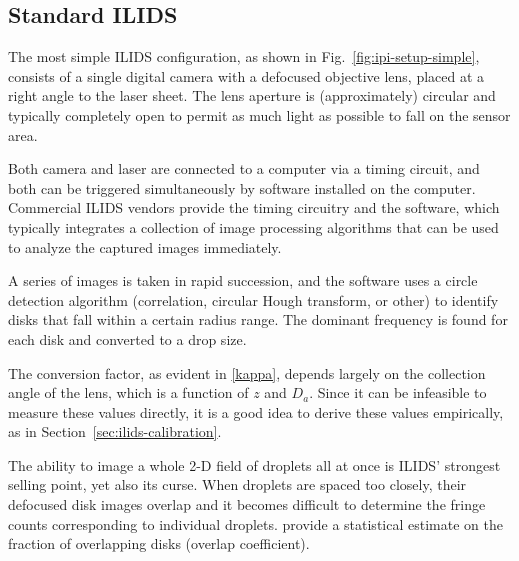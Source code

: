 \documentclass[11.5pt,oneside]{book}
\newcommand*{\figref}[1]{Fig.~\ref{#1}}
\newcommand*{\secref}[1]{Section~\ref{#1}}
\begin{document}
\subsection{Standard ILIDS}
The most simple ILIDS configuration, as shown in \figref{fig:ipi-setup-simple},
consists of a single digital camera with a defocused objective lens, placed at a right
angle to the laser sheet. The lens aperture is (approximately) circular and
typically completely open to permit as much light as possible to fall on the
sensor area.

Both camera and laser are connected to a computer via a timing circuit, and both
can be triggered simultaneously by software installed on the computer.
Commercial ILIDS vendors provide the timing circuitry and the software, which
typically integrates a collection of image processing algorithms that can be
used to analyze the captured images immediately.

A series of images is taken in rapid succession, and the software uses a circle
detection algorithm (correlation, circular Hough transform, or other) to
identify disks that fall within a certain radius range. The dominant frequency
is found for each disk and converted to a drop size.

The conversion factor, as evident in \eqref{kappa}, depends largely on the
collection angle of the lens, which is a function of $z$ and $D_a$. Since it can
be infeasible to measure these values directly, it is a good idea to derive
these values empirically, as in \secref{sec:ilids-calibration}.

The ability to image a whole 2-D field of droplets all at once is ILIDS' strongest
selling point, yet also its curse. When droplets are spaced too closely, their
defocused disk images overlap and it becomes difficult to determine the fringe counts
corresponding to individual droplets. \citet{Damaschke02} provide a statistical
estimate on the fraction of overlapping disks (overlap coefficient). 
\end{document}

